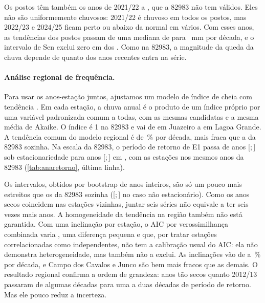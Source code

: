 \documentclass[11pt,a4paper]{article}
\newcommand{\IC}[2]{[#1;\,#2]}            %
\newcommand{\Est}{82983}
\begin{document}
Os postos têm também os anos de 2021/22 a \UltimoAnoAna{}, que a \Est{} não tem válidos. Eles não são
uniformemente chuvosos: 2021/22 é chuvoso em todos os postos, mas 2022/23 e 2024/25 ficam perto ou
abaixo da normal em vários. Com esses anos, as tendências dos postos passam de uma mediana de
\SenAnaAteUltMediana{} para \SenAnaTodosMediana{}~mm por década, e o intervalo de Sen exclui zero em
\NAnaTodosNegSig{} dos \NAnaRetorno{}. Como na \Est{}, a magnitude da queda da chuva depende de quanto
dos anos recentes entra na série.

\paragraph{Análise regional de frequência.} Para usar os \NRegObs{} anos-estação juntos, ajustamos
um modelo de índice de cheia com tendência \parencite{hosking1997}. Em cada estação, a chuva anual
é o produto de um índice próprio por uma variável padronizada comum a todas, com as mesmas
candidatas e a mesma média de Akaike. O índice é 1 na \Est{} e vai de \RegIndiceJuazeiro{} em
Juazeiro a \RegIndiceLagoaGrande{} em Lagoa Grande. A tendência comum do modelo regional é de
\RegEfeito{}\,\% por década, mais fraca que a da \Est{} sozinha. Na escala da \Est{}, o período de retorno de E1 passa de \TRegEst{} anos
\IC{\TRegEstICinf}{\TRegEstICsup} sob estacionariedade para \TRegNS{} anos
\IC{\TRegNSICinf}{\TRegNSICsup} em \UltimoAnoNS{}, com as estações nos mesmos anos da \Est{}
(\cref{tab:anaretorno}, última linha).

Os intervalos, obtidos por bootstrap de anos inteiros, são só um pouco mais estreitos que os da
\Est{} sozinha (\IC{\TNSMediaUltICinf}{\TNSMediaUltICsup} no caso não estacionário). Como os anos
secos coincidem nas estações vizinhas, juntar seis séries não equivale a ter seis vezes mais anos.
A homogeneidade da tendência na região também não está garantida. Com uma inclinação por estação,
o AIC por verossimilhança combinada varia \DAICRegSite{}, uma diferença pequena e que, por tratar
estações correlacionadas como independentes, não tem a calibração usual do AIC: ela não
demonstra heterogeneidade, mas também não a exclui. As inclinações vão de
\RegEfeitoSiteMin{} a \RegEfeitoSiteMax{}\,\% por década, e Campo dos Cavalos e Junco são bem mais
fracos que as demais. O resultado regional confirma a ordem de grandeza: anos tão secos quanto
2012/13 passaram de algumas décadas para uma a duas décadas de período de retorno. Mas ele pouco
reduz a incerteza.
\end{document}
